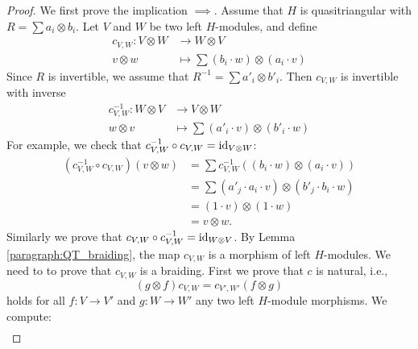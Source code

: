 \begin{proof}
We first prove the implication $\implies$. Assume that $H$ is quasitriangular
with $R=\sum a_{i}\otimes b_{i}$. Let $V$ and $W$ be two left $H$-modules, and
define
\begin{align*}
c_{V,W}:V\otimes W & \to W\otimes V\\
v\otimes w & \mapsto\sum(b_{i}\cdot w)\otimes(a_{i}\cdot v)
\end{align*}
Since $R$ is invertible, we assume that $R^{-1}=\sum a'_{i}\otimes b'_{i}$. 
Then $c_{V,W}$ is invertible with inverse
\begin{align*}
c_{V,W}^{-1}:W\otimes V & \to V\otimes W\\
w\otimes v & \mapsto\sum(a'_{i}\cdot v)\otimes(b'_{i}\cdot w)
\end{align*}
For example, we check that $c_{V,W}^{-1}\circ c_{V,W}=\mathrm{id}_{V\otimes W}$:
\begin{align*}
(c_{V,W}^{-1}\circ c_{V,W})(v\otimes w) & =\sum c_{V,W}^{-1}((b_{i}\cdot w)\otimes(a_{i}\cdot v))\\
 & =\sum(a'_{j}\cdot a_{i}\cdot v)\otimes(b'_{j}\cdot b_{i}\cdot w)\\
 & =(1\cdot v)\otimes(1\cdot w)\\
 & =v\otimes w.
\end{align*}
Similarly we prove that $c_{V,W}\circ c_{V,W}^{-1}=\mathrm{id}_{W\otimes V}$.
By Lemma \ref{paragraph:QT_braiding}, the map $c_{V,W}$ is a morphism of left $H$-modules. 
We need to to prove that $c_{V,W}$ is a braiding. First we prove
that $c$ is natural, i.e., 
\[
(g\otimes f)c_{V,W}=c_{V',W'}(f\otimes g)
\]
holds for all $f:V\to V'$ and $g:W\to W'$ any two left $H$-module morphisms.
We compute: 
\begin{align*}

\end{align*}
\end{proof}
